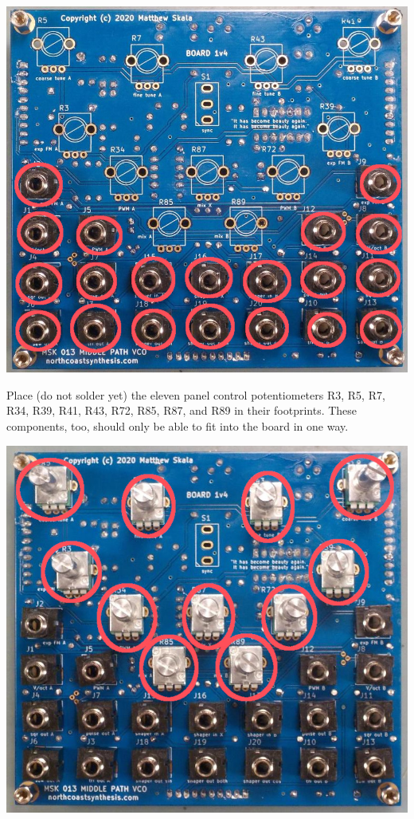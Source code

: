 \nopagebreak
\noindent\includegraphics[width=\linewidth]{jack-sockets.jpg}

Place (do not solder yet) the eleven panel control potentiometers R3, R5,
R7, R34, R39, R41, R43, R72, R85, R87, and R89 in their footprints.  These
components, too, should only be able to fit into the board in one way.

\nopagebreak
\noindent\includegraphics[width=\linewidth]{panel-pots.jpg}

